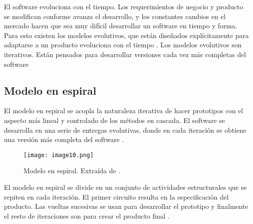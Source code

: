 \par El software evoluciona con el tiempo. Los requerimientos de negocio y producto se modifican conforme avanza el desarrollo, y los constantes cambios en el mercado hacen que sea muy difícil desarrollar un software en tiempo y forma. Para esto existen los modelos evolutivos, que están diseñados explícitamente para adaptarse a un producto evoluciona con el tiempo \cite{pressmanIngenieriaSoftwareEnfoque2013}. Los modelos evolutivos son iterativos. Están pensados para desarrollar versiones cada vez más completas del software
%
%
\subsection{Modelo en espiral}
\par El modelo en espiral se acopla la naturaleza iterativa de hacer prototipos con el aspecto más lineal y controlado de los métodos en cascada. El software se desarrolla en una serie de entregas evolutivas, donde en cada iteración se obtiene una versión más completa del software \cite{pressmanIngenieriaSoftwareEnfoque2013}.
\begin{figure}[H]
  \centering
  \texttt{[image: image10.png]}
  \caption{Modelo en espiral. Extraída de \cite{pressmanIngenieriaSoftwareEnfoque2013}.}
  \label{fig:x Modelo en espiral}
\end{figure}
\par El modelo en espiral se divide en un conjunto de actividades estructurales que se repiten en cada iteración. El primer circuito resulta en la especificación del producto. Las vueltas sucesivas se usan para desarrollar el prototipo y finalmente el resto de iteraciones son para crear el producto final \cite{pressmanIngenieriaSoftwareEnfoque2013}.
